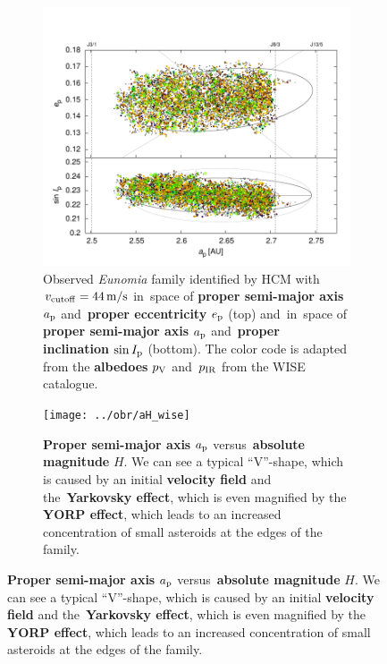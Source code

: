 \documentclass{beamer}
\newlength{\vyska}
\newlength{\vyskaB}
\newlength{\main}
\begin{document}
\begin{frame}
\begin{columns}[t]
\begin{column}{\main}
\begin{tcolorbox}[title=Identification of members of the Eunomia family\vphantom{Úy},height=0.25\vyskaB]
	\begin{figure}[htbp]
		\begin{subfigure}[b]{0.3\textwidth}
			\centering
			\captionsetup{width=.88\linewidth}
			\includegraphics[width=1.0\textwidth]{../obr/ae_ai_wise}
			\caption{Observed \textit{Eunomia} family identified by HCM with $v_{\rm cutoff} = 44\,{\rm m/s}$ in~space of \textbf{proper semi-major axis} $a_{\rm p}$ and~\textbf{proper eccentricity} $e_{\rm p}$ (top) and~in~space of \textbf{proper semi-major axis} $a_{\rm p}$ and~\textbf{proper inclination} $\sin I_{\rm p}$ (bottom). The color code is adapted from the \textbf{albedoes} $p_{\rm V}$ and~$p_{\rm IR}$ from the WISE  catalogue\cite{nugent15}.}
			\label{fig:ae_ai_wise}
		\end{subfigure}
		\begin{subfigure}[b]{0.26\textwidth}
			\centering
			\captionsetup{width=.88\linewidth}
			\texttt{[image: ../obr/aH\_wise]}
			\caption{\textbf{Proper semi-major axis} $a_{\rm p}$ versus~\textbf{absolute magnitude} $H$. We can see a typical \enquote{V}-shape, which is caused by an initial \textbf{velocity field} and the~\textbf{Yarkovsky effect}, which is even magnified by the \textbf{YORP effect}, which leads to an increased concentration of small asteroids at the edges of the family.\newline\newline}


\end{subfigure}
\end{figure}
\end{tcolorbox}
\end{column}
\end{columns}
\end{frame}
\end{document}
